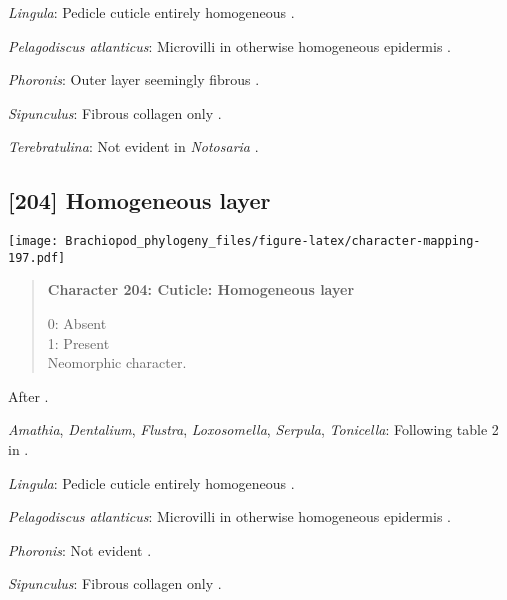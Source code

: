\documentclass[openany]{book}
\theoremstyle{definition}
\theoremstyle{definition}
\theoremstyle{definition}
\theoremstyle{remark}
\begin{document}
\hypertarget{Lingula-coding-203}{}
\emph{Lingula}: Pedicle cuticle entirely homogeneous
\citep{Williams1997Introduction}.

\hypertarget{Pelagodiscus_atlanticus-coding-203}{}
\emph{Pelagodiscus atlanticus}: Microvilli in otherwise homogeneous
epidermis \citep{Williams1997Introduction}.

\hypertarget{Phoronis-coding-203}{}
\emph{Phoronis}: Outer layer seemingly fibrous \citep{BereiterHahn1984}.

\hypertarget{Sipunculus-coding-203}{}
\emph{Sipunculus}: Fibrous collagen only \citep{BereiterHahn1984}.

\hypertarget{Terebratulina-coding-203}{}
\emph{Terebratulina}: Not evident in \emph{Notosaria}
\citep{BereiterHahn1984, Williams1997Introduction}.

\subsection*{{[}204{]} Homogeneous layer}\label{homogeneous-layer}

\texttt{[image: Brachiopod\_phylogeny\_files/figure-latex/character-mapping-197.pdf]}

\begin{quote}
\textbf{Character 204: Cuticle: Homogeneous layer}

0: Absent\\
1: Present\\
Neomorphic character.
\end{quote}

After \citet{Borisanova2015}.

\hypertarget{Amathia-coding-204}{}
\emph{Amathia}, \emph{Dentalium}, \emph{Flustra}, \emph{Loxosomella},
\emph{Serpula}, \emph{Tonicella}: Following table 2 in
\citet{Borisanova2015}.

\hypertarget{Lingula-coding-204}{}
\emph{Lingula}: Pedicle cuticle entirely homogeneous
\citep{Williams1997Introduction}.

\hypertarget{Pelagodiscus_atlanticus-coding-204}{}
\emph{Pelagodiscus atlanticus}: Microvilli in otherwise homogeneous
epidermis \citep{Williams1997Introduction}.

\hypertarget{Phoronis-coding-204}{}
\emph{Phoronis}: Not evident \citep{BereiterHahn1984}.

\hypertarget{Sipunculus-coding-204}{}
\emph{Sipunculus}: Fibrous collagen only \citep{BereiterHahn1984}.
\end{document}
